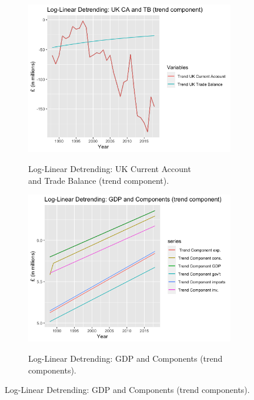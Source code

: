 \documentclass[12pt]{article}
\begin{document}
\begin{figure}[h!]
\centering
\begin{subfigure}{.5\textwidth}
  \centering
\includegraphics[scale=0.45]{11.png}
\label{}
\caption{Log-Linear Detrending: UK Current Account \\ and Trade Balance (trend component).}
\end{subfigure}%
\begin{subfigure}{.5\textwidth}
\centering
\includegraphics[scale=0.45]{10.png}
\label{}
\caption{Log-Linear Detrending: GDP and Components (trend components).}
\end{subfigure}
\end{figure}
\end{document}
